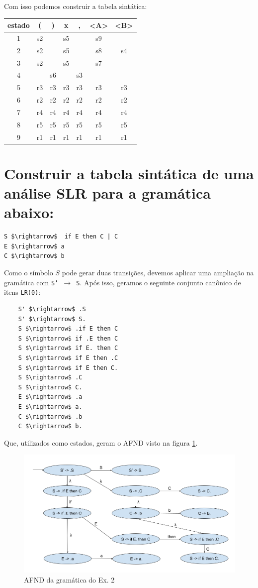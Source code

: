 \documentclass{article}
\begin{document}
Com isso podemos construir a tabela sintática:
\begin{center}
\begin{tabular}{ |c|c|c|c|c|c|c| } 
\hline
estado  & ( & ) & x & , & <A> & <B> \\
\hline
1 & s2 &    & s5 &    & s9 &   \\
\hline
2 & s2 &    & s5 &    & s8 & s4\\
\hline
3 & s2 &    & s5 &    & s7 &   \\
\hline
4 &    & s6 &    & s3 &    &   \\
\hline
5 & r3 & r3 & r3 & r3 & r3 & r3\\
\hline
6 & r2 & r2 & r2 & r2 & r2 & r2\\
\hline
7 & r4 & r4 & r4 & r4 & r4 & r4\\
\hline
8 & r5 & r5 & r5 & r5 & r5 & r5\\
\hline
9 & r1 & r1 & r1 & r1 & r1 & r1\\
\hline
\end{tabular}
\end{center}

\section{Construir a tabela sintática de uma análise SLR para a gramática abaixo:}

\begin{lstlisting}
S $\rightarrow$  if E then C | C
E $\rightarrow$ a
C $\rightarrow$ b
\end{lstlisting}

Como o símbolo $S$ pode gerar duas transições, devemos aplicar uma ampliação na gramática com \texttt{S' $\rightarrow$ S}. Após isso, geramos o seguinte conjunto canônico de itens \texttt{LR(0)}:

\begin{lstlisting}
	S' $\rightarrow$ .S
	S' $\rightarrow$ S.
	S $\rightarrow$ .if E then C
	S $\rightarrow$ if .E then C
	S $\rightarrow$ if E. then C
	S $\rightarrow$ if E then .C
	S $\rightarrow$ if E then C.
	S $\rightarrow$ .C
	S $\rightarrow$ C.
	E $\rightarrow$ .a
	E $\rightarrow$ a.
	C $\rightarrow$ .b
	C $\rightarrow$ b.
\end{lstlisting}

Que, utilizados como estados, geram o AFND visto na figura \ref{fig:AFND2}.

\begin{figure}[ht!]
	\centering
	\includegraphics[width=0.5\linewidth]{p2/AFND}
	\caption{AFND da gramática do Ex. 2}
	\label{fig:AFND2}
\end{figure}
\end{document}

